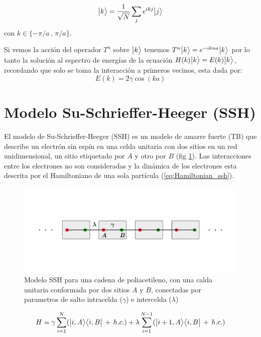     \begin{equation}
        \big |{k}\big \rangle = \frac{1}{\sqrt{N}} \sum_j e^{ikj} \big |{j}\big \rangle 
    \end{equation}
    con $k \in \{-\pi/a\,,\,\pi/a\}$.
    
    Si vemos la acción del operador $T^n$ sobre $\big |{k}\big \rangle$ tenemos $T^n \big |{k}\big \rangle =  e^{-ikna}\big |{k}\big \rangle$ 
    por lo tanto la solución al espectro de energías de la ecuación $H(k)\big |{k}\big \rangle = E(k)\big |{k}\big \rangle$, recordando que solo se toma la interacción a primeros vecinos, esta dada por:
    \begin{equation}
        E(k) = 2\gamma \cos(ka)
    \end{equation}
    
\section{Modelo Su-Schrieffer-Heeger (SSH)}
    

El modelo de Su-Schrieffer-Heeger (SSH) es un modelo de amarre fuerte (TB) que describe un electrón sin espín en una celda unitaria con dos sitios en un red unidimensional, un sitio etiquetado por $A$ y otro por $B$ (fig \ref{fig:SSH_Fig}). Las interacciones entre los electrones no son consideradas y la dinámica de los electrones esta descrita por el Hamiltoniano de una sola partícula (\ref{eq:Hamiltonian_ssh}).

\begin{figure}[h!]
    \centering
    \includegraphics[width=\textwidth]{Imagenes/Models/SSH_example.pdf}\vspace{-1.5cm}
    \caption{Modelo SSH para una cadena de poliacetileno, con una calda unitaria conformada por dos sitios $A$ y $B$, conectadas por parametros de salto intracelda ($\gamma$) e intercelda ($\lambda$)}
    \label{fig:SSH_Fig}
\end{figure}


\begin{equation}
    \label{eq:Hamiltonian_ssh}
    H = \gamma \sum_{i=1}^N (\big |{i,A}\big \rangle\big \langle{i,B}\big | \,+\, h.c. ) + \lambda \sum_{i=1}^{N-1} (\big |{i + 1,A}\big \rangle\big \langle{i,B}\big | \,+\, h.c. ) 
\end{equation}


